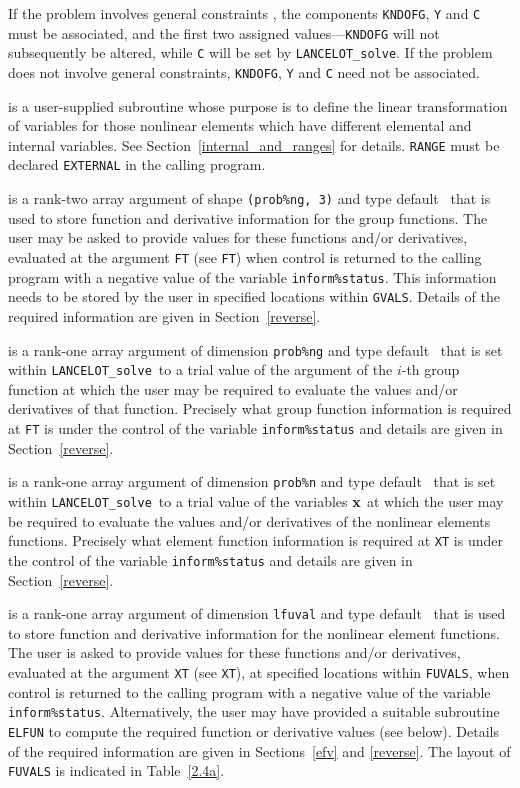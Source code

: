 \documentclass{galahad}
\newcommand{\fullpackagename}{LANC\-E\-LOT}
\newcommand{\solver}{{\tt \fullpackagename\_solve}}
\begin{document}
\begin{description}
If the problem involves general constraints ,
the components {\tt KNDOFG}, {\tt Y} and {\tt C} must be associated, and
the first two assigned values---{\tt KNDOFG} will not subsequently be
altered, while {\tt C} will be set by \solver.
If the problem does not involve general
constraints, {\tt KNDOFG}, {\tt Y} and {\tt C}
need not be associated.

 is a user-supplied subroutine whose purpose is to
define the linear transformation of variables for those nonlinear
elements which have different elemental and internal variables.
See Section~\ref{internal_and_ranges} for details.
{\tt RANGE}  must be declared {\tt EXTERNAL} in the calling program.

 is a rank-two \intentout array argument of
shape {\tt (prob\%ng, 3)} and type default \realdp\,
that is used to store function and derivative information for the
group functions. The user may be asked to provide values for these functions
and/or derivatives, evaluated at
the argument {\tt FT} (see {\tt FT})
when control is returned to the calling
program with a negative value of the variable {\tt inform\%status}.
This information needs to be stored by the user
in specified locations within {\tt GVALS}.
Details of the required information are given in Section~\ref{reverse}.

 is a rank-one \intentinout array argument of
dimension {\tt prob\%ng} and type default \realdp\, that is set within \solver\
to a trial value of the argument of the $i$-th group function
at which the user may be required to evaluate the values and/or derivatives
of that function. Precisely what group function information
is required at {\tt FT} is under the control of the
variable {\tt inform\%status} and details are given in Section~\ref{reverse}.

 is a rank-one \intentinout array argument of
dimension {\tt prob\%n} and type default \realdp\, that is set within \solver\
to a trial value of the variables ${\mathbf{x}}$ at which the
user may be required to evaluate the values and/or derivatives
of the nonlinear elements functions. Precisely what element function
information is required at {\tt XT} is under the control of the
variable {\tt inform\%status} and details are given in Section~\ref{reverse}.

\itt{FUVALS} is a rank-one \intentinout array argument of
dimension {\tt lfuval} and type default \realdp\, that is used to store
function and derivative information for the nonlinear element functions.
The user is asked to provide values for these functions and/or derivatives,
evaluated at the argument {\tt XT} (see {\tt XT}), at specified
locations within {\tt FUVALS}, when control is returned to the calling
program with a negative value of the variable {\tt inform\%status}.
Alternatively, the user may have provided a suitable subroutine {\tt ELFUN}
to compute the required function or derivative values (see below). Details
of the required information are given in Sections~\ref{efv} and \ref{reverse}.
The layout of {\tt FUVALS} is indicated in Table~\ref{2.4a}.


\end{description}
\end{document}
